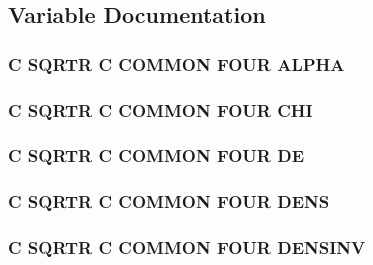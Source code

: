 \subsection{Variable Documentation}
\hypertarget{four_8com_a6cd48f9abc4bb80fe87f0cc6c8be9605}{
\subsubsection[{A\-L\-P\-H\-A}]{\setlength{\rightskip}{0pt plus 5cm}C S\-Q\-R\-T\-R C C\-O\-M\-M\-O\-N F\-O\-U\-R A\-L\-P\-H\-A}}\label{four_8com_a6cd48f9abc4bb80fe87f0cc6c8be9605}
\hypertarget{four_8com_adcda87f0444de21ee7a1b42d0a5c4080}{
\subsubsection[{C\-H\-I}]{\setlength{\rightskip}{0pt plus 5cm}C S\-Q\-R\-T\-R C C\-O\-M\-M\-O\-N F\-O\-U\-R C\-H\-I}}\label{four_8com_adcda87f0444de21ee7a1b42d0a5c4080}
\hypertarget{four_8com_a3a2f491799a3e573efcadd5d7318cb0c}{
\subsubsection[{D\-E}]{\setlength{\rightskip}{0pt plus 5cm}C S\-Q\-R\-T\-R C C\-O\-M\-M\-O\-N F\-O\-U\-R D\-E}}\label{four_8com_a3a2f491799a3e573efcadd5d7318cb0c}
\hypertarget{four_8com_ac6b99276f56a09eacc1bec701e2fd463}{
\subsubsection[{D\-E\-N\-S}]{\setlength{\rightskip}{0pt plus 5cm}C S\-Q\-R\-T\-R C C\-O\-M\-M\-O\-N F\-O\-U\-R D\-E\-N\-S}}\label{four_8com_ac6b99276f56a09eacc1bec701e2fd463}
\hypertarget{four_8com_ab3697c20897d6f0c2fbd38fc17234f25}{
\subsubsection[{D\-E\-N\-S\-I\-N\-V}]{\setlength{\rightskip}{0pt plus 5cm}C S\-Q\-R\-T\-R C C\-O\-M\-M\-O\-N F\-O\-U\-R D\-E\-N\-S\-I\-N\-V}}\label{four_8com_ab3697c20897d6f0c2fbd38fc17234f25}
